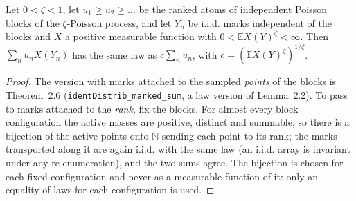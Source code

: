 \begin{theorem}\label{thm:sg:ranked-marking}
  \leanok
Let $0<\zeta<1$, let $u_1\ge u_2\ge\dots$ be the ranked atoms of independent Poisson blocks of the
$\zeta$-Poisson process, and let $Y_n$ be i.i.d. marks independent of the blocks and $X$ a positive
measurable function with $0<\mathbb E X(Y)^\zeta<\infty$. Then
$\sum_nu_nX(Y_n)$ has the same law as $c\sum_nu_n$, with $c=(\mathbb E X(Y)^\zeta)^{1/\zeta}$.
\end{theorem}
\begin{proof}
  \leanok
The version with marks attached to the sampled \emph{points} of the blocks is Theorem~2.6
(\texttt{identDistrib\_marked\_sum}, a law version of Lemma~2.2). To pass to marks attached to the
\emph{rank}, fix the blocks. For almost every block configuration the active masses are positive,
distinct and summable, so there is a bijection of the active points onto $\mathbb N$ sending each
point to its rank; the marks transported along it are again i.i.d. with the same law (an i.i.d. array is
invariant under any re-enumeration), and the two sums agree. The bijection is chosen for each fixed
configuration and never as a measurable function of it: only an equality of laws for each
configuration is used.
\end{proof}

